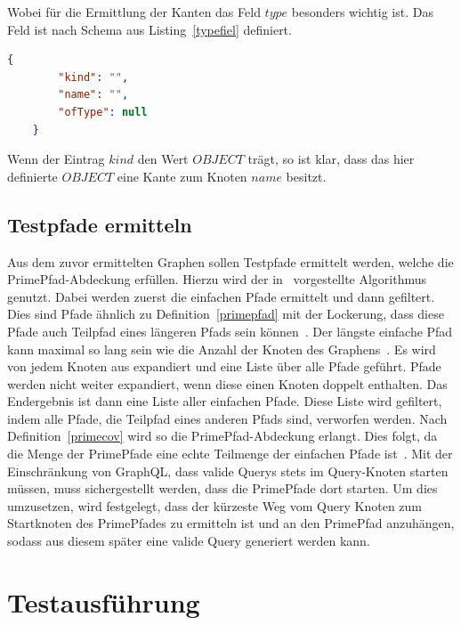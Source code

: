 Wobei für die Ermittlung der Kanten das Feld $type$ besonders wichtig ist.
Das Feld ist nach Schema aus Listing~\ref{typefiel} definiert.

\begin{lstlisting}[language=json, caption={Type-Field},captionpos=b, label={typefiel}]
    {
        "kind": "",
        "name": "",
        "ofType": null
    }
\end{lstlisting}

Wenn der Eintrag $kind$ den Wert $OBJECT$ trägt, so ist klar, dass das hier definierte $OBJECT$ eine Kante zum Knoten $name$ besitzt.

\subsection{Testpfade ermitteln}
\label{testpfade}

Aus dem zuvor ermittelten Graphen sollen Testpfade ermittelt werden, welche die PrimePfad-Abdeckung erfüllen.
Hierzu wird der in~\cite[Finding Prime Test Paths]{software-testing} vorgestellte Algorithmus genutzt.
Dabei werden zuerst die einfachen Pfade ermittelt und dann gefiltert.
Dies sind Pfade ähnlich zu Definition~\ref{primepfad} mit der Lockerung, dass diese Pfade auch Teilpfad eines längeren Pfads sein können~\cite[vgl. S. 35]{software-testing}.
Der längste einfache Pfad kann maximal so lang sein wie die Anzahl der Knoten des Graphens~\cite[vgl. S.41 ]{software-testing}.
Es wird von jedem Knoten aus expandiert und eine Liste über alle Pfade geführt.
Pfade werden nicht weiter expandiert, wenn diese einen Knoten doppelt enthalten.
Das Endergebnis ist dann eine Liste aller einfachen Pfade.
Diese Liste wird gefiltert, indem alle Pfade, die Teilpfad eines anderen Pfads sind, verworfen werden.
Nach Definition~\ref{primecov} wird so die PrimePfad-Abdeckung erlangt.
Dies folgt, da die Menge der PrimePfade eine echte Teilmenge der einfachen Pfade ist~\cite[vgl. S. 35]{software-testing}.
Mit der Einschränkung von GraphQL, dass valide Querys stets im Query-Knoten starten müssen, muss sichergestellt werden, dass die PrimePfade dort starten.
Um dies umzusetzen, wird festgelegt, dass der kürzeste Weg vom Query Knoten zum Startknoten des PrimePfades zu ermitteln ist und an den PrimePfad anzuhängen,
sodass aus diesem später eine valide Query generiert werden kann.

\newpage
\section{Testausführung}

